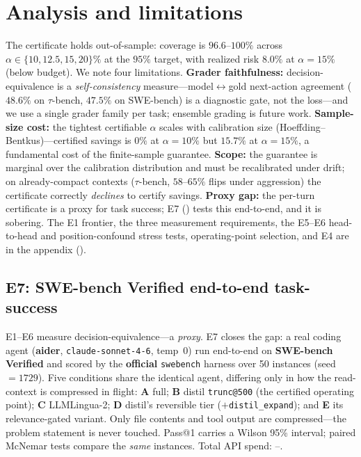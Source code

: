 \documentclass{article}
\newcommand{\sweEsevenN}{50}\newcommand{\sweEsevenSeed}{1729}%
\newcommand{\sweEsevenTotalCost}{--}}
\begin{document}
\section{Analysis and limitations}
\label{sec:analysis}
The certificate holds out-of-sample: coverage is $96.6$--$100\%$ across
$\alpha\in\{10,12.5,15,20\}\%$ at the $95\%$ target, with realized risk $8.0\%$ at
$\alpha=15\%$ (below budget). We note four limitations. \textbf{Grader faithfulness:}
decision-equivalence is a \emph{self-consistency} measure---model$\leftrightarrow$gold
next-action agreement ($48.6\%$ on $\tau$-bench, $47.5\%$ on SWE-bench) is a diagnostic
gate, not the loss---and we use a single grader family per task; ensemble grading is future
work. \textbf{Sample-size cost:} the tightest certifiable $\alpha$ scales with calibration
size (Hoeffding--Bentkus)---certified savings is $0\%$ at $\alpha=10\%$ but $15.7\%$ at
$\alpha=15\%$, a fundamental cost of the finite-sample guarantee. \textbf{Scope:} the
guarantee is marginal over the calibration distribution and must be recalibrated under
drift; on already-compact contexts ($\tau$-bench, $58$--$65\%$ flips under aggression) the
certificate correctly \emph{declines} to certify savings. \textbf{Proxy gap:} the per-turn
certificate is a proxy for task success; E7 () tests this end-to-end, and it is
sobering. The E1 frontier, the three measurement requirements, the E5--E6 head-to-head and
position-confound stress tests, operating-point selection, and E4 are in the appendix
().

\subsection{E7: SWE-bench Verified end-to-end task-success}
\label{sec:e7}

E1--E6 measure decision-equivalence---a \emph{proxy}. E7 closes the gap: a real coding
agent (\textbf{aider}, \texttt{claude-sonnet-4-6}, temp~0) run end-to-end on \textbf{SWE-bench
Verified} and scored by the \textbf{official} \texttt{swebench} harness over \sweEsevenN{}
instances (seed~$=\sweEsevenSeed{}$). Five conditions share the identical agent, differing only
in how the read-context is compressed in flight: \textbf{A} full; \textbf{B} distil
\texttt{trunc@500} (the certified operating point); \textbf{C} LLMLingua-2; \textbf{D} distil's
reversible tier ($+$\texttt{distil\_expand}); and \textbf{E} its relevance-gated variant. Only
file contents and tool output are compressed---the problem statement is never touched. Pass@1
carries a Wilson 95\% interval; paired McNemar tests compare the \emph{same} instances. Total
API spend: \sweEsevenTotalCost{}.
\end{document}

